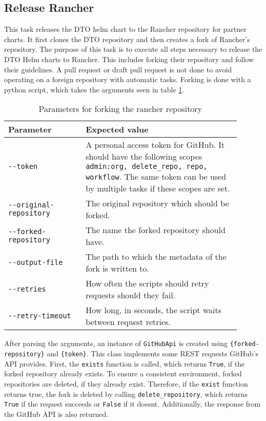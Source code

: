 \pagebreak
\subsection{Release Rancher}\label{subsec:release-rancher}

This task releases the DTO helm chart to the Rancher repository for partner charts.
It first clones the DTO repository and then creates a fork of Rancher's repository.
The purpose of this task is to execute all steps necessary to release the DTO Helm charts to Rancher.
This includes forking their repository and follow their guidelines.
A pull request or draft pull request is not done to avoid operating on a foreign repository with automatic tasks.
Forking is done with a python script, which takes the arguments seen in table \ref{tab:parameters-for-forking-the-rancher-repository}.

\begin{table}[H]
    \centering
    \caption{Parameters for forking the rancher repository}
    \label{tab:parameters-for-forking-the-rancher-repository}
    \begin{tabular}{p{0.3\linewidth}|p{0.6\linewidth}}
        Parameter & Expected value \\
        \hline
        \verb|--token| & A personal access token for GitHub.
            It should have the following scopes \verb|admin:org, delete_repo, repo, workflow|.
            The same token can be used by multiple tasks if these scopes are set. \\
        \verb|--original-repository| & The original repository which should be forked. \\
        \verb|--forked-repository| & The name the forked repository should have. \\
        \verb|--output-file| & The path to which the metadata of the fork is written to. \\
        \verb|--retries| & How often the scripts should retry requests should they fail. \\
        \verb|--retry-timeout| & How long, in seconds, the script waits between request retries. \\
    \end{tabular}
\end{table}

After parsing the arguments, an instance of \verb|GitHubApi| is created using \verb|{forked-repository}| and \verb|{token}|.
This class implements some REST requests GitHub's API provides.
First, the \verb|exists| function is called, which returns \verb|True|, if the forked repository already exists.
To ensure a consistent environment, forked repositories are deleted, if they already exist.
Therefore, if the \verb|exist| function returns true, the fork is deleted by calling \verb|delete_repository|, which returns \verb|True| if the request succeeds or \verb|False| if it doesnt.
Additionally, the response from the GitHub API is also returned.

